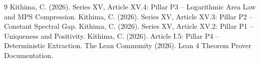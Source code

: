 \documentclass[11pt,a4paper]{article}
\begin{document}

\begin{thebibliography}{9}
  Kithima, C. (2026). Series XV, Article XV.4: Pillar P3 – Logarithmic Area Law and MPS Compression.
  Kithima, C. (2026). Series XV, Article XV.3: Pillar P2 – Constant Spectral Gap.
  Kithima, C. (2026). Series XV, Article XV.2: Pillar P1 – Uniqueness and Positivity.
  Kithima, C. (2026). Article I.5: Pillar P4 – Deterministic Extraction.
  The Lean Community (2026). Lean 4 Theorem Prover Documentation.
\end{thebibliography}
\end{document}
